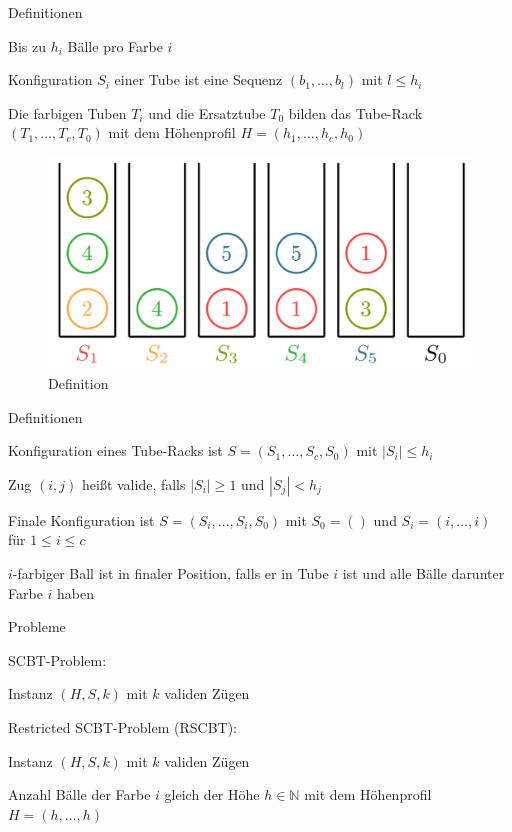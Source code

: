 \documentclass{beamer}
\begin{document}
		\begin{frame}{Definitionen}
	\begin{pointlist}
		\item Bis zu $h_i$ Bälle pro Farbe $i$
		\item Konfiguration $S_i$ einer Tube ist eine Sequenz $(b_1,\dots,b_l)$ mit $l\leq h_i$
		\item Die farbigen Tuben $T_i$ und die Ersatztube $T_0$ bilden das Tube-Rack $(T_1,\dots,T_c, T_0)$ mit dem Höhenprofil $H=(h_1,\dots,h_c, h_0)$
		\end{pointlist}
		
\begin{figure}[ht]
		\includegraphics[width=.65\textwidth]{def}
		\caption{Definition}
    \end{figure}
		\end{frame}
		
		
\begin{frame}{Definitionen}
	\begin{pointlist}
		\item Konfiguration eines Tube-Racks ist $S=(S_1,\dots,S_c, S_0)$ mit $|S_i| \leq h_i$
		\item Zug $(i,j)$ heißt valide, falls $|S_i|\geq 1$ und $|S_j| < h_j$
		\item Finale Konfiguration ist $S=(S_i, \dots, S_i, S_0)$ mit $S_0 = ()$ und $S_i =(i,\dots,i)$ für $1\leq i \leq c$
		\item $i$-farbiger Ball ist in finaler Position, falls er in Tube $i$ ist und alle Bälle darunter Farbe $i$ haben
	\end{pointlist}
\end{frame}

\begin{frame}{Probleme}
	\begin{pointlist}
		\item SCBT-Problem:
		\begin{arrowlist}
 			\item Instanz $(H,S,k)$ mit $k$ validen Zügen
		\end{arrowlist}
		\item Restricted SCBT-Problem (RSCBT):
		\begin{arrowlist}
 			\item Instanz $(H,S,k)$ mit $k$ validen Zügen
 			\item Anzahl Bälle der Farbe $i$ gleich der Höhe $h\in\mathbb{N}$ mit dem Höhenprofil $H=(h,\dots,h)$
		\end{arrowlist}
	\end{pointlist}
\end{frame}
\end{document}
